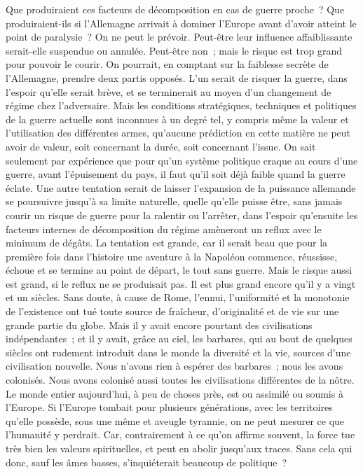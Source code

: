 \documentclass[french,twoside]{book} %
\begin{document}
Que produiraient ces facteurs de décomposition en cas de guerre proche ? Que produiraient-ils si l'Allemagne arrivait à dominer l'Europe avant d'avoir atteint le point de paralysie ? On ne peut le prévoir. Peut-être leur influence affaiblissante serait-elle suspendue ou annulée. Peut-être non ; mais le risque est trop grand pour pouvoir le courir. On pourrait, en comptant sur la faiblesse secrète de l'Allemagne, prendre deux partis opposés. L'un serait de risquer la guerre, dans l'espoir qu'elle serait brève, et se terminerait au moyen d'un changement de régime chez l'adversaire. Mais les conditions stratégiques, techniques et politiques de la guerre actuelle sont inconnues à un degré tel, y compris même la valeur et l'utilisation des différentes armes, qu'aucune prédiction en cette matière ne peut avoir de valeur, soit concernant la durée, soit concernant l'issue. On sait seulement par expérience que pour qu'un système politique craque au cours d'une guerre, avant l'épuisement du pays, il faut qu'il soit déjà faible quand la guerre éclate. Une autre tentation serait de laisser l'expansion de la puissance allemande se poursuivre jusqu'à sa limite naturelle, quelle qu'elle puisse être, sans jamais courir un risque de guerre pour la ralentir ou l'arrêter, dans l'espoir qu'ensuite les facteurs internes de décomposition du régime amèneront un reflux avec le minimum de dégâts. La tentation est grande, car il serait beau que pour la première fois dans l'histoire une aventure à la Napoléon commence, réussisse, échoue et se termine au point de départ, le tout sans guerre. Mais le risque aussi est grand, si le reflux ne se produisait pas. Il est plus grand encore qu'il y a vingt et un siècles. Sans doute, à cause de Rome, l'ennui, l'uniformité et la monotonie de l'existence ont tué toute source de fraîcheur, d'originalité et de vie sur une grande partie du globe. Mais il y avait encore pourtant des civilisations indépendantes ; et il y avait, grâce au ciel, les barbares, qui au bout de quelques siècles ont rudement introduit dans le monde la diversité et la vie, sources d'une civilisation nouvelle. Nous n'avons rien à espérer des barbares ; nous les avons colonisés. Nous avons colonisé aussi toutes les civilisations différentes de la nôtre. Le monde entier aujourd'hui, à peu de choses près, est ou assimilé ou soumis à l'Europe. Si l'Europe tombait pour plusieurs générations, avec les territoires qu'elle possède, sous une même et aveugle tyrannie, on ne peut mesurer ce que l'humanité y perdrait. Car, contrairement à ce qu'on affirme souvent, la force tue très bien les valeurs spirituelles, et peut en abolir jusqu'aux traces. Sans cela qui donc, sauf les âmes basses, s'inquiéterait beaucoup de politique ?\par
\end{document}

